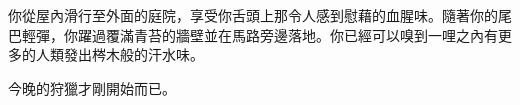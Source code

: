 \begin{HauntStory}
  你從屋內滑行至外面的庭院，享受你舌頭上那令人感到慰藉的血腥味。隨著你的尾巴輕彈，你躍過覆滿青苔的牆壁並在馬路旁邊落地。你已經可以嗅到一哩之內有更多的人類發出梣木般的汗水味。

  今晚的狩獵才剛開始而已。
\end{HauntStory}
